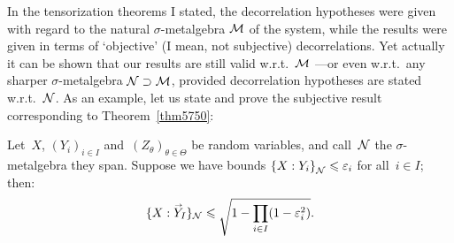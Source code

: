 In the tensorization theorems I stated,
the decorrelation hypotheses were given with regard to
the natural $\sigma$-metalgebra $\mathcal{M}$ of the system,
while the results were given in terms of `objective' (I mean, not subjective) decorrelations.
Yet actually it can be shown that our results are still valid w.r.t.~$\mathcal{M}$
—or even w.r.t.\ any sharper $\sigma$-metalgebra $\mathcal{N}\supset\mathcal{M}$,
provided decorrelation hypotheses are stated w.r.t.~$\mathcal{N}$.
As an example, let us state and prove the subjective result corresponding to Theorem~\ref{thm5750}:
%
\begin{Cor}\label{cor4274}
Let~$X$, $(Y_i)_{i\in I}$ and~$(Z_\theta)_{\theta\in\Theta}$ be random variables,
and call~$\mathcal{N}$ the $\sigma$-metalgebra they span.
Suppose we have bounds ${\{X:Y_i\}}_{\mathcal{N}} \leqslant \varepsilon_i$ for all~$i\in I$;
then:
\[\label{for4193}
\{ X : \vec{Y}_I \}_{\mcal{N}} \leq \sqrt{1-\prod_{i\in I}(1-\epsilon_i^2)} .\]
\end{Cor}

